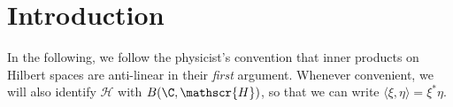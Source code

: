 \section{Introduction}

In the following, we follow the physicist's convention that inner products on Hilbert spaces are anti-linear in their \emph{first} argument. Whenever convenient, we will also identify $\mathscr{H}$ with $B(\C,\mathscr{H})$, so that we can write $\langle \xi,\eta\rangle = \xi^*\eta$.

